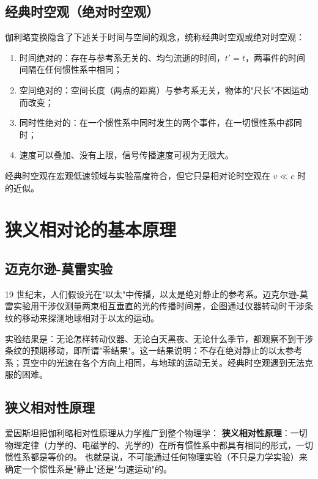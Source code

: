     \subsection{经典时空观（绝对时空观）}
    伽利略变换隐含了下述关于时间与空间的观念，统称经典时空观或绝对时空观：
    \begin{enumerate}
        \item 时间绝对的：存在与参考系无关的、均匀流逝的时间，$t'=t$，两事件的时间间隔在任何惯性系中相同；
        \item 空间绝对的：空间长度（两点的距离）与参考系无关，物体的"尺长"不因运动而改变；
        \item 同时性绝对的：在一个惯性系中同时发生的两个事件，在一切惯性系中都同时；
        \item 速度可以叠加、没有上限，信号传播速度可视为无限大。
    \end{enumerate}
    经典时空观在宏观低速领域与实验高度符合，但它只是相对论时空观在 $v\ll c$ 时的近似。


\section{狭义相对论的基本原理}
    \subsection{迈克尔逊-莫雷实验}
    19 世纪末，人们假设光在"以太"中传播，以太是绝对静止的参考系。迈克尔逊-莫雷实验用干涉仪测量两束相互垂直的光的传播时间差，企图通过仪器转动时干涉条纹的移动来探测地球相对于以太的运动。

    实验结果是：无论怎样转动仪器、无论白天黑夜、无论什么季节，都观察不到干涉条纹的预期移动，即所谓"零结果"。这一结果说明：不存在绝对静止的以太参考系；真空中的光速在各个方向上相同，与地球的运动无关。经典时空观遇到无法克服的困难。

    \subsection{狭义相对性原理}
    爱因斯坦把伽利略相对性原理从力学推广到整个物理学：
    \textbf{狭义相对性原理}：一切物理定律（力学的、电磁学的、光学的）在所有惯性系中都具有相同的形式，一切惯性系都是等价的。
    也就是说，不可能通过任何物理实验（不只是力学实验）来确定一个惯性系是"静止"还是"匀速运动"的。

